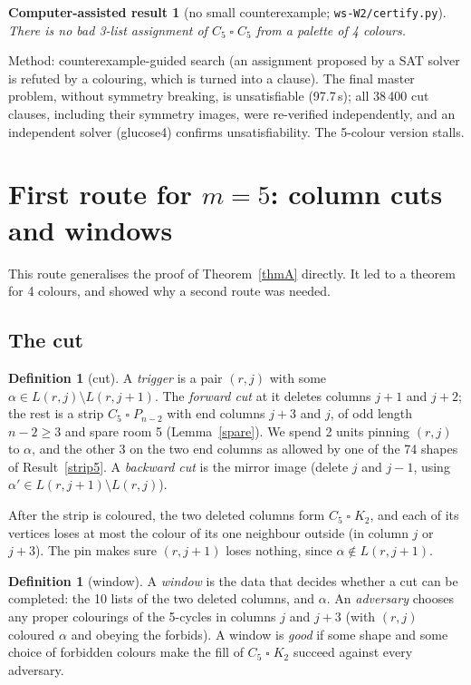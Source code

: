 \documentclass[11pt]{article}
\theoremstyle{plain}
\newtheorem{computed}[theorem]{Computer-assisted result}
\theoremstyle{definition}
\newtheorem{definition}[theorem]{Definition}
\theoremstyle{remark}
\newcommand{\T}{\mathbin{\square}}
\newcommand{\sm}{\setminus}
\newcommand{\script}[1]{\texttt{#1}}
\begin{document}
\begin{computed}[no small counterexample; \script{ws-W2/certify.py}]\label{c5c5}
There is no bad 3-list assignment of $C_5 \T C_5$ from a palette of 4 colours.
\end{computed}

Method: counterexample-guided search (an assignment proposed by a SAT solver is refuted by a colouring, which is turned
into a clause). The final master problem, without symmetry breaking, is unsatisfiable (97.7\,s); all 38\,400 cut clauses,
including their symmetry images, were re-verified independently, and an independent solver (glucose4) confirms
unsatisfiability. The 5-colour version stalls.

\section{First route for $m = 5$: column cuts and windows}\label{sec:windows}

This route generalises the proof of Theorem~\ref{thmA} directly. It led to a theorem for 4 colours, and showed why a
second route was needed.

\subsection{The cut}

\begin{definition}[cut]\label{cutdef}
A \emph{trigger} is a pair $(r, j)$ with some $\alpha \in L(r, j) \sm L(r, j+1)$. The \emph{forward cut} at it deletes
columns $j+1$ and $j+2$; the rest is a strip $C_5 \T P_{n-2}$ with end columns $j+3$ and $j$, of odd length $n - 2 \ge 3$ and
spare room 5 (Lemma~\ref{spare}). We spend 2 units pinning $(r, j)$ to $\alpha$, and the other 3 on the two end columns as
allowed by one of the 74 shapes of Result~\ref{strip5}. A \emph{backward cut} is the mirror image (delete $j$ and $j - 1$,
using $\alpha' \in L(r, j+1) \sm L(r, j)$).
\end{definition}

After the strip is coloured, the two deleted columns form $C_5 \T K_2$, and each of its vertices loses at most the colour
of its one neighbour outside (in column $j$ or $j+3$). The pin makes sure $(r, j+1)$ loses nothing, since
$\alpha \notin L(r, j+1)$.

\begin{definition}[window]
A \emph{window} is the data that decides whether a cut can be completed: the 10 lists of the two deleted columns, and
$\alpha$. An \emph{adversary} chooses any proper colourings of the 5-cycles in columns $j$ and $j + 3$ (with $(r, j)$
coloured $\alpha$ and obeying the forbids). A window is \emph{good} if some shape and some choice of forbidden colours make
the fill of $C_5 \T K_2$ succeed against every adversary.
\end{definition}
\end{document}
